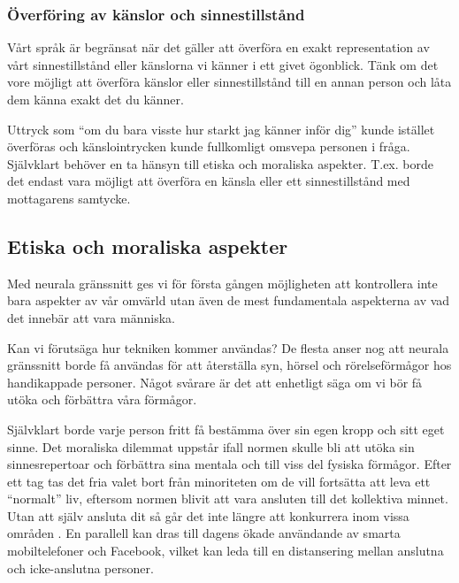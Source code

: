 \documentclass[12pt, a4paper]{article}
\begin{document}

\subsubsection{Överföring av känslor och sinnestillstånd}

Vårt språk är begränsat när det gäller att överföra en exakt representation av vårt sinnestillstånd eller känslorna vi känner i ett givet ögonblick. Tänk om det vore möjligt att överföra känslor eller sinnestillstånd till en annan person och låta dem känna exakt det du känner.

Uttryck som ``om du bara visste hur starkt jag känner inför dig'' kunde istället överföras och känslointrycken kunde fullkomligt omsvepa personen i fråga. Självklart behöver en ta hänsyn till etiska och moraliska aspekter. T.ex. borde det endast vara möjligt att överföra en känsla eller ett sinnestillstånd med mottagarens samtycke.


\subsection{Etiska och moraliska aspekter}


Med neurala gränssnitt ges vi för första gången möjligheten att kontrollera inte bara aspekter av vår omvärld utan även de mest fundamentala aspekterna av vad det innebär att vara människa.

Kan vi förutsäga hur tekniken kommer användas? De flesta anser nog att neurala gränssnitt borde få användas för att återställa syn, hörsel och rörelseförmågor hos handikappade personer. Något svårare är det att enhetligt säga om vi bör få utöka och förbättra våra förmågor.

Självklart borde varje person fritt få bestämma över sin egen kropp och sitt eget sinne. Det moraliska dilemmat uppstår ifall normen skulle bli att utöka sin sinnesrepertoar och förbättra sina mentala och till viss del fysiska förmågor. Efter ett tag tas det fria valet bort från minoriteten om de vill fortsätta att leva ett ``normalt'' liv, eftersom normen blivit att vara ansluten till det kollektiva minnet. Utan att själv ansluta dit så går det inte längre att konkurrera inom vissa områden \cite{ethics_eu,ethics1}. En parallell kan dras till dagens ökade användande av smarta mobiltelefoner och Facebook, vilket kan leda till en distansering mellan anslutna och icke-anslutna personer.
\end{document}
